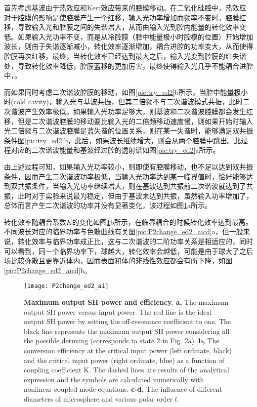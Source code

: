首先考虑基波由于热效应和Kerr效应带来的腔模移动。在二氧化硅腔中，热效应对于腔膜的影响是使腔膜产生一个红移，输入光功率增加而频率不变时，腔膜红移，导致输入光和腔膜之间的失谐增大，从而由输入光到腔内能量的转化效率变低。如果输入光功率不变，而是从冷腔膜（腔中能量极小时腔模的位置）开始增加波长，则由于失谐逐渐减小，转化效率逐渐增加，耦合进腔的功率变大，从而使得腔膜再次红移，最终，当转化效率已经达到最大之后，输入光变到腔膜的红失谐处，导致转化效率降低，腔膜蓝移的更加厉害，最终使得输入光几乎不能耦合进腔中\cite{carmon2004dynamical}，。

而如果同时考虑二次谐波腔膜的移动，如图\ref{pic:try_ed2}b所示，当腔中能量极小时(cold cavity)，输入光与基波共振，但其二倍频不与二次谐波模式共振，此时二次谐波产生效率极低。如果输入光功率足够大，则基波和二次谐波腔膜都会发生红移，但是二次谐波腔膜的移动要比输入光的二倍频移动速度慢，则如果开始时输入光二倍频与二次谐波腔膜是蓝失谐的位置关系，则在某一失谐时，能够满足双共振条件图\ref{pic:try_ed2}b，此后，如果波长继续增大，则会从两个腔膜中跳出。此过程对应的二次谐波能量和基波经过腔的透射谱如图\ref{pic:try_ed2}a所示。

由上述过程可知，如果输入光功率较小，则即使有腔膜移动，也不足以达到双共振条件，因而产生二次谐波功率极低，当输入光功率达到某一临界值时，恰好能够达到双共振条件，当输入光功率继续增大，则在基波达到共振前二次谐波就达到了共振，此时对于实验来说最为稳定，但由于基波未达到共振，虽然输入功率增加了，总体而言产生二次谐波的功率并没有显著变化，该过程如图\ref{pic:P2change_ed2_ai}a所示。

转化效率随耦合系数$K$的变化如图\ref{pic:P2change_ed2_ai}b所示，在临界耦合的时候转化效率达到最高。不同波长对应的临界功率与色散曲线有关图\ref{pic:P2change_ed2_aicd}a，但一般来说，转化效率与临界功率成正比，这与二次谐波的二阶功率关系是相适应的，同时可以看到，同一个临界功率下，球越大，转化效率会越低，可能是由于球大了之后场比较弥散且更靠近体内，因而表面和体的非线性效应都会有所下降，如图\ref{pic:P2change_ed2_aicd}b。
\begin{figure}
\texttt{[image: P2change\_ed2\_ai]}
\centering
\caption{\textbf{Maximum output SH power and efficiency. a,} The maximum output SH power versus input power. The red line is the ideal output SH power by setting the off-resonance coefficient to one. The black line represents the maximum output SH power considering all the possible detuning (corresponds to state 2 in Fig. 2a). \textbf{b, } The conversion efficiency at the critical input power (left ordinate, black) and the critical input power (right ordinate, blue) as a function of coupling coefficient K. The dashed lines are results of the analytical expression and the symbols are calculated numerically with nonlinear coupled-mode equations. \textbf{c-d, } The influence of different diameters of microsphere and various polar order $l$. }
\label{pic:P2change_ed2_ai}
\end{figure}

